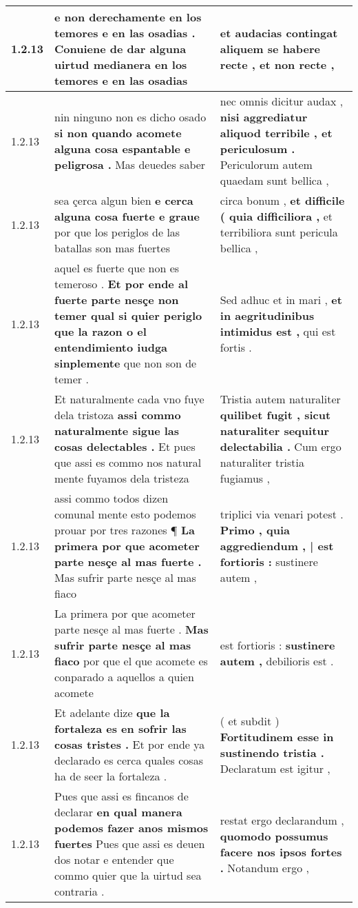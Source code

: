 \begin{tabular}{|p{1cm}|p{6.5cm}|p{6.5cm}|}
1.2.13 & e non derechamente en los temores e en las osadias . \textbf{ Conuiene de dar alguna uirtud medianera en los temores } e en las osadias & et audacias contingat \textbf{ aliquem se habere recte , } et non recte , \\\hline
1.2.13 & nin ninguno non es dicho osado \textbf{ si non quando acomete alguna cosa espantable e peligrosa . } Mas deuedes saber & nec omnis dicitur audax , \textbf{ nisi aggrediatur aliquod terribile , et periculosum . } Periculorum autem quaedam sunt bellica , \\\hline
1.2.13 & sea çerca algun bien \textbf{ e cerca alguna cosa fuerte e graue } por que los periglos de las batallas son mas fuertes & circa bonum , \textbf{ et difficile ( quia difficiliora , } et terribiliora sunt pericula bellica , \\\hline
1.2.13 & aquel es fuerte que non es temeroso . \textbf{ Et por ende al fuerte parte nesçe non temer qual si quier periglo que la razon o el entendimiento iudga sinplemente } que non son de temer . & Sed adhuc et in mari , \textbf{ et in aegritudinibus intimidus est , } qui est fortis . \\\hline
1.2.13 & Et naturalmente cada vno fuye dela tristoza \textbf{ assi commo naturalmente sigue las cosas delectables . } Et pues que assi es commo nos natural mente fuyamos dela tristeza & Tristia autem naturaliter \textbf{ quilibet fugit , sicut naturaliter sequitur delectabilia . } Cum ergo naturaliter tristia fugiamus , \\\hline
1.2.13 & assi commo todos dizen comunal mente esto podemos prouar por tres razones ¶ \textbf{ La primera por que acometer parte nesçe al mas fuerte . } Mas sufrir parte nesçe al mas fiaco & triplici via venari potest . \textbf{ Primo , quia aggrediendum , | est fortioris : } sustinere autem , \\\hline
1.2.13 & La primera por que acometer parte nesçe al mas fuerte . \textbf{ Mas sufrir parte nesçe al mas fiaco } por que el que acomete es conparado a aquellos a quien acomete & est fortioris : \textbf{ sustinere autem , } debilioris est . \\\hline
1.2.13 & Et adelante dize \textbf{ que la fortaleza es en sofrir las cosas tristes . } Et por ende ya declarado es cerca quales cosas ha de seer la fortaleza . & ( et subdit ) \textbf{ Fortitudinem esse in sustinendo tristia . } Declaratum est igitur , \\\hline
1.2.13 & Pues que assi es fincanos de declarar \textbf{ en qual manera podemos fazer anos mismos fuertes } Pues que assi es deuen dos notar e entender que commo quier que la uirtud sea contraria . & restat ergo declarandum , \textbf{ quomodo possumus facere nos ipsos fortes . } Notandum ergo , \\\hline

\end{tabular}
